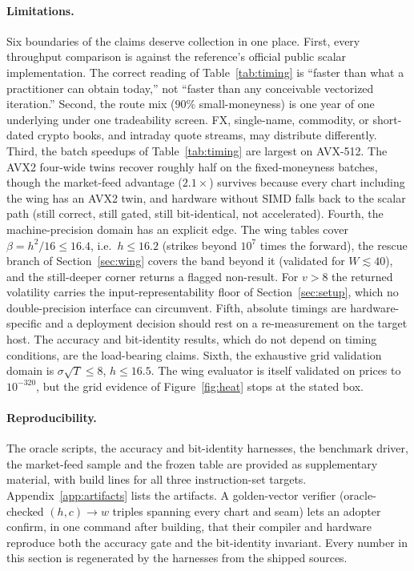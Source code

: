 \documentclass[11pt]{article}
\begin{document}
\paragraph{Limitations.}
Six boundaries of the claims deserve collection in one place. First, every throughput comparison is against the reference's official public scalar implementation. The correct reading of Table~\ref{tab:timing} is ``faster than what a practitioner can obtain today,'' not ``faster than any conceivable vectorized iteration.'' Second, the route mix ($90\%$ small-moneyness) is one year of one underlying under one tradeability screen. FX, single-name, commodity, or short-dated crypto books, and intraday quote streams, may distribute differently. Third, the batch speedups of Table~\ref{tab:timing} are largest on AVX-512. The AVX2 four-wide twins recover roughly half on the fixed-moneyness batches, though the market-feed advantage ($2.1\times$) survives because every chart including the wing has an AVX2 twin, and hardware without SIMD falls back to the scalar path (still correct, still gated, still bit-identical, not accelerated). Fourth, the machine-precision domain has an explicit edge. The wing tables cover $\beta=h^2/16\le16.4$, i.e.\ $h\le16.2$ (strikes beyond $10^{7}$ times the forward), the rescue branch of Section~\ref{sec:wing} covers the band beyond it (validated for $W\lesssim40$), and the still-deeper corner returns a flagged non-result. For $v>8$ the returned volatility carries the input-representability floor of Section~\ref{sec:setup}, which no double-precision interface can circumvent. Fifth, absolute timings are hardware-specific and a deployment decision should rest on a re-measurement on the target host. The accuracy and bit-identity results, which do not depend on timing conditions, are the load-bearing claims. Sixth, the exhaustive grid validation domain is $\sigma\sqrt T\le8$, $h\le16.5$. The wing evaluator is itself validated on prices to $10^{-320}$, but the grid evidence of Figure~\ref{fig:heat} stops at the stated box.

\paragraph{Reproducibility.}
The oracle scripts, the accuracy and bit-identity harnesses, the benchmark driver, the market-feed sample and the frozen table are provided as supplementary material, with build lines for all three instruction-set targets. Appendix~\ref{app:artifacts} lists the artifacts. A golden-vector verifier (oracle-checked $(h,c)\to w$ triples spanning every chart and seam) lets an adopter confirm, in one command after building, that their compiler and hardware reproduce both the accuracy gate and the bit-identity invariant. Every number in this section is regenerated by the harnesses from the shipped sources.
\end{document}
